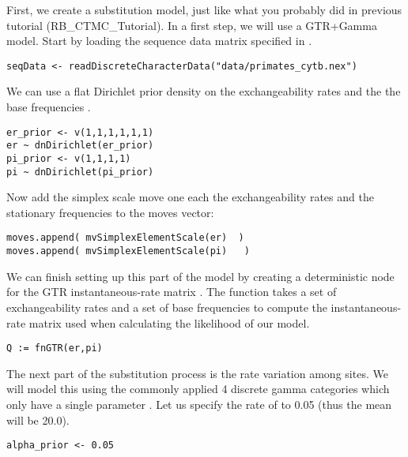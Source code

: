 First, we create a substitution model, just like what you probably did in previous tutorial (\EG RB\_CTMC\_Tutorial). 
In a first step, we will use a GTR+Gamma model.
Start by loading the sequence data matrix specified in .
{\tt \begin{snugshade*}
\begin{lstlisting}
seqData <- readDiscreteCharacterData("data/primates_cytb.nex")
\end{lstlisting}
\end{snugshade*}}
We can use a flat Dirichlet prior density on the exchangeability rates  and the the base frequencies .
{\tt \begin{snugshade*}
\begin{lstlisting}
er_prior <- v(1,1,1,1,1,1) 
er ~ dnDirichlet(er_prior)
pi_prior <- v(1,1,1,1) 
pi ~ dnDirichlet(pi_prior)
\end{lstlisting}
\end{snugshade*}}
Now add the simplex scale move one each the exchangeability rates  and the stationary frequencies  to the moves vector:
{\tt \small \begin{snugshade*}
\begin{lstlisting}
moves.append( mvSimplexElementScale(er)  )
moves.append( mvSimplexElementScale(pi)   )
\end{lstlisting}
\end{snugshade*}}
We can finish setting up this part of the model by creating a deterministic node for the GTR instantaneous-rate matrix . 
The  function takes a set of exchangeability rates and a set of base frequencies to compute the instantaneous-rate matrix used when calculating the likelihood of our model.
{\tt \begin{snugshade*}
\begin{lstlisting}
Q := fnGTR(er,pi)
\end{lstlisting}
\end{snugshade*}}
The next part of the substitution process is the rate variation among sites. We will model this using the commonly applied 4 discrete gamma categories which only have a single parameter .
Let us specify the rate of  to 0.05 (thus the mean will be 20.0).
{\tt\begin{snugshade*}
\begin{lstlisting}
alpha_prior <- 0.05                                                                             
\end{lstlisting}
\end{snugshade*}}
